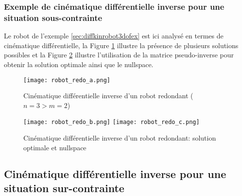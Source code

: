 \subsubsection{Exemple de cinématique différentielle inverse pour une situation sous-contrainte}


Le robot de l'exemple \ref{sec:diffkinrobot3dofex} est ici analysé en termes de cinématique différentielle, la Figure \ref{fig:robot_redo_a} illustre la présence de plusieurs solutions possibles et la Figure \ref{fig:robot_redo_c} illustre l'utilisation de la matrice pseudo-inverse pour obtenir la solution optimale ainsi que le nullspace. 

\begin{figure}[H]
	\centering
		\texttt{[image: robot\_redo\_a.png]}
	\caption{Cinématique différentielle inverse d'un robot redondant ($n=3>m=2$)}
	\label{fig:robot_redo_a}
\end{figure}
%

\begin{figure}[H]
	\centering
		\texttt{[image: robot\_redo\_b.png]}
		\texttt{[image: robot\_redo\_c.png]}
	\caption{Cinématique différentielle inverse d'un robot redondant: solution optimale et nullspace}
	\label{fig:robot_redo_c}
\end{figure}




\newpage
\subsection{Cinématique différentielle inverse pour une situation sur-contrainte}
\label{sec:overconstraintrobot}

